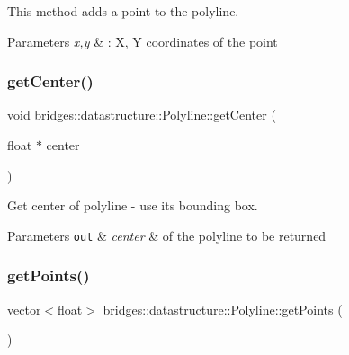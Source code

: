 This method adds a point to the polyline. 


\begin{DoxyParams}{Parameters}
{\em x,y} & \+: X, Y coordinates of the point \\
\hline
\end{DoxyParams}
\mbox{\label{classbridges_1_1datastructure_1_1_polyline_ad0783deb77873eda19528681bbbca25c}} 
\subsubsection{\texorpdfstring{get\+Center()}{getCenter()}}
{\footnotesize\ttfamily void bridges\+::datastructure\+::\+Polyline\+::get\+Center (\begin{DoxyParamCaption}\item[{float $\ast$}]{center }\end{DoxyParamCaption})\hspace{0.3cm}{\ttfamily [inline]}}



Get center of polyline -\/ use its bounding box. 


\begin{DoxyParams}[1]{Parameters}
\mbox{\tt out}  & {\em center} & of the polyline to be returned \\
\hline
\end{DoxyParams}
\mbox{\label{classbridges_1_1datastructure_1_1_polyline_a634034b6874af45e2b8c56d70e8725c5}} 
\subsubsection{\texorpdfstring{get\+Points()}{getPoints()}}
{\footnotesize\ttfamily vector$<$float$>$ bridges\+::datastructure\+::\+Polyline\+::get\+Points (\begin{DoxyParamCaption}{ }\end{DoxyParamCaption})\hspace{0.3cm}{\ttfamily [inline]}}



